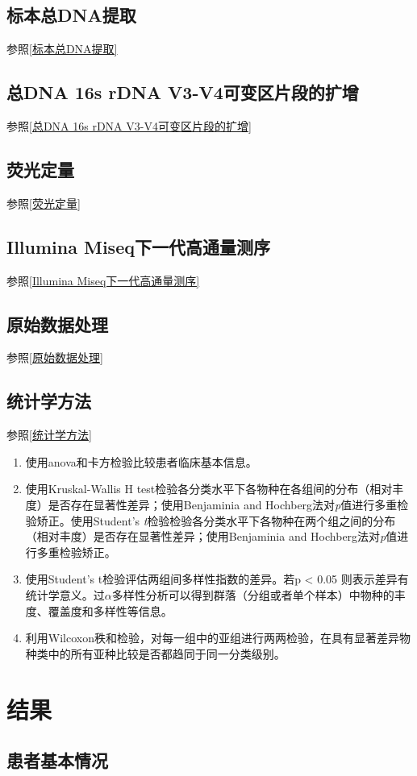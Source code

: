   \subsection{标本总DNA提取}
  参照\ref{标本总DNA提取}
  \subsection{总DNA 16s rDNA V3-V4可变区片段的扩增}
  参照\ref{总DNA 16s rDNA V3-V4可变区片段的扩增}
  \subsection{荧光定量}
  参照\ref{荧光定量}
  \subsection{Illumina Miseq下一代高通量测序}
  参照\ref{Illumina Miseq下一代高通量测序}
  \subsection{原始数据处理}
  参照\ref{原始数据处理}
  \subsection{统计学方法}
  参照\ref{统计学方法}
  \begin{enumerate}
    \item 使用anova和卡方检验比较患者临床基本信息。
    \item 使用Kruskal-Wallis H test检验各分类水平下各物种在各组间的分布（相对丰度）是否存在显著性差异；使用Benjaminia and Hochberg法对\textit{p}值进行多重检验矫正。使用Student’s \textit{t}检验检验各分类水平下各物种在两个组之间的分布（相对丰度）是否存在显著性差异；使用Benjaminia and Hochberg法对\textit{p}值进行多重检验矫正。
    \item 使用Student’s t检验评估两组间多样性指数的差异。若p < 0.05 则表示差异有统计学意义。过$\alpha$多样性分析可以得到群落（分组或者单个样本）中物种的丰度、覆盖度和多样性等信息。
    \item 利用Wilcoxon秩和检验，对每一组中的亚组进行两两检验，在具有显著差异物种类中的所有亚种比较是否都趋同于同一分类级别。
  \end{enumerate}

\section{结果}
  \subsection{患者基本情况}

